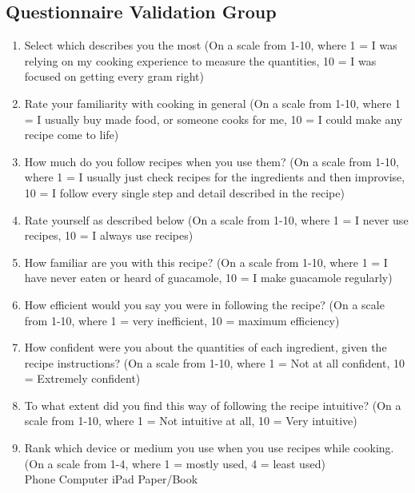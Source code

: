\subsection{Questionnaire Validation Group}
\label{app:questionnaire-validation}
\begin{enumerate}
    \item Select which describes you the most (On a scale from 1-10, where 1 = I was relying on my cooking experience to measure the quantities, 10 = I was focused on getting every gram right)
    
    \item Rate your familiarity with cooking in general (On a scale from 1-10, where 1 = I usually buy made food, or someone cooks for me, 10 = I could make any recipe come to life)
    
    \item How much do you follow recipes when you use them? (On a scale from 1-10, where 1 = I usually just check recipes for the ingredients and then improvise, 10 = I follow every single step and detail described in the recipe)
    
    \item Rate yourself as described below (On a scale from 1-10, where 1 = I never use recipes, 10 = I always use recipes)
    
    \item How familiar are you with this recipe? (On a scale from 1-10, where 1 = I have never eaten or heard of guacamole, 10 = I make guacamole regularly)
    
    \item How efficient would you say you were in following the recipe? (On a scale from 1-10, where 1 = very inefficient, 10 = maximum efficiency)
    
    \item How confident were you about the quantities of each ingredient, given the recipe instructions? (On a scale from 1-10, where 1 = Not at all confident, 10 = Extremely confident)
    
    \item To what extent did you find this way of following the recipe intuitive? (On a scale from 1-10, where 1 = Not intuitive at all, 10 = Very intuitive)
    
    \item Rank which device or medium you use when you use recipes while cooking. (On a scale from 1-4, where 1 = mostly used, 4 = least used)\\
    Phone \hfill Computer \hfill iPad \hfill Paper/Book
    

\end{enumerate}
